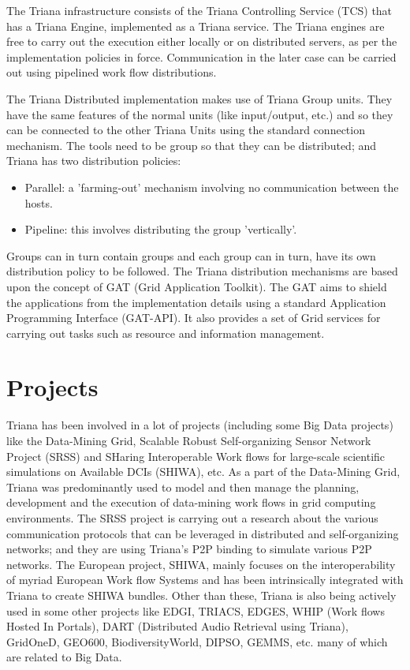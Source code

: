 \documentclass[9pt,twocolumn,twoside]{styles/osajnl}
\begin{document}
\cite{TrianaDocumentation2} The Triana infrastructure consists of the
Triana Controlling Service (TCS) that has a Triana Engine, implemented
as a Triana service.  The Triana engines are free to carry out the
execution either locally or on distributed servers, as per the
implementation policies in force.  Communication in the later case can
be carried out using pipelined work flow distributions.

The Triana Distributed implementation makes use of Triana Group units.
They have the same features of the normal units (like input/output,
etc.) and so they can be connected to the other Triana Units using the
standard connection mechanism.  The tools need to be group so that
they can be distributed; and Triana has two distribution policies:

\begin{itemize}

\item Parallel: a 'farming-out' mechanism involving no communication between the hosts.
\item Pipeline: this involves distributing the group 'vertically'.

\end{itemize}

Groups can in turn contain groups and each group can in turn, have its
own distribution policy to be followed.  The Triana distribution
mechanisms are based upon the concept of GAT (Grid Application
Toolkit).  The GAT aims to shield the applications from the
implementation details using a standard Application Programming
Interface (GAT-API).  It also provides a set of Grid services for
carrying out tasks such as resource and information management.

\section{Projects}

\cite{Triana-projects} Triana has been involved in a lot of projects
(including some Big Data projects) like the
\cite{Triana-Data-Mining-Grid} Data-Mining Grid, \cite{Triana-SRSS}
Scalable Robust Self-organizing Sensor Network Project (SRSS) and
\cite{Triana-SHIWA} SHaring Interoperable Work flows for large-scale
scientific simulations on Available DCIs (SHIWA), etc.  As a part of
the Data-Mining Grid, Triana was predominantly used to model and then
manage the planning, development and the execution of data-mining work
flows in grid computing environments.  \cite{Triana-SRSS} The SRSS
project is carrying out a research about the various communication
protocols that can be leveraged in distributed and self-organizing
networks; and they are using Triana's P2P binding to simulate various
P2P networks.  The European project, SHIWA, mainly focuses on the
interoperability of myriad European Work flow Systems and has been
intrinsically integrated with Triana to create \cite{Triana-SHIWA}
SHIWA bundles.  Other than these, Triana is also being actively used
in some other projects like EDGI, TRIACS, EDGES, WHIP (Work flows
Hosted In Portals), DART (Distributed Audio Retrieval using Triana),
GridOneD, GEO600, BiodiversityWorld, DIPSO, GEMMS, etc. many of which
are related to Big Data.
\end{document}
